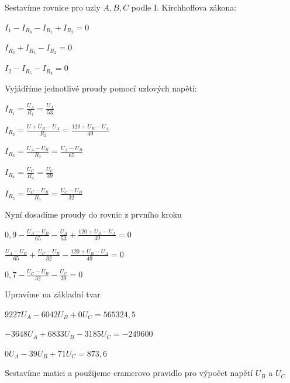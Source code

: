 \documentclass{article}
\begin{document}
\noindent Sestavíme rovnice pro uzly $A,B,C$ podle I. Kirchhoffova zákona:

\vspace{1pc}
\centerline{$I_1-I_{R_3}-I_{R_1}+I_{R_2}=0$}
\centerline{$I_{R_3}+I_{R_5}-I_{R_2}=0$}
\centerline{$I_2-I_{R_5}-I_{R_4}=0$}
\vspace{2pc}

\noindent Vyjádříme jednotlivé proudy pomocí uzlových napětí:

\vspace{1pc}
\centerline{$I_{R_1}=\frac{U_A}{R_1}=\frac{U_A}{53}$}
\centerline{$I_{R_2}=\frac{U+U_B-U_A}{R_2}=\frac{120+U_B-U_A}{49}$}
\centerline{$I_{R_3}=\frac{U_A-U_B}{R_3}=\frac{U_A-U_B}{65}$}
\centerline{$I_{R_4}=\frac{U_C}{R_4}=\frac{U_C}{39}$}
\centerline{$I_{R_5}=\frac{U_C -U_B}{R_5}=\frac{U_C-U_B}{32}$}
\vspace{2pc}

\noindent Nyní dosadíme proudy do rovnic z prvního kroku

\vspace{1pc}
\centerline{$0,9-\frac{U_A-U_B}{65}-\frac{U_A}{53}+\frac{120+U_B-U_A}{49}=0$}
\centerline{$\frac{U_A-U_B}{65}+\frac{U_C-U_B}{32}-\frac{120+U_B-U_A}{49}=0$}
\centerline{$0,7-\frac{U_C-U_B}{32}-\frac{U_C}{39}=0$}
\vspace{2pc}

\noindent Upravíme na základní tvar

\vspace{1pc}
\centerline{$9227U_A-6042U_B + 0U_C = 565324,5$}
\centerline{$-3648U_A+6833U_B-3185U_C = -249600$}
\centerline{$0U_A-39U_B+71U_C = 873,6$}
\vspace{2pc}

\noindent Sestavíme matici a použijeme cramerovo pravidlo pro výpočet napětí $U_B$ a $U_C$

\vspace{1pc}
\end{document}

